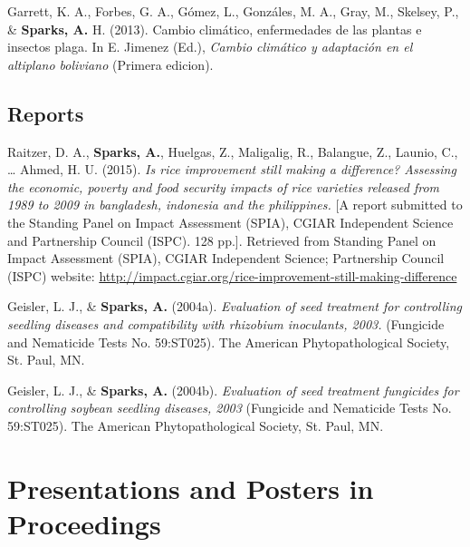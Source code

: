 \documentclass[11pt, a4paper]{awesome-cv}
\begin{document}
\leavevmode\hypertarget{ref-Garrett2013}{}%
Garrett, K. A., Forbes, G. A., Gómez, L., Gonzáles, M. A., Gray, M., Skelsey, P., \& \textbf{Sparks, A.} H. (2013). Cambio climático, enfermedades de las plantas e insectos plaga. In E. Jimenez (Ed.), \emph{Cambio climático y adaptación en el altiplano boliviano} (Primera edicion).

\endgroup

\hypertarget{reports}{%
\subsection{Reports}\label{reports}}

\begingroup
\setlength{\parindent}{-0.5in}
\setlength{\leftskip}{0.5in}

\hypertarget{refs_reports}{}
\leavevmode\hypertarget{ref-Raitzer2015}{}%
Raitzer, D. A., \textbf{Sparks, A.}, Huelgas, Z., Maligalig, R., Balangue, Z., Launio, C., \ldots{} Ahmed, H. U. (2015). \emph{Is rice improvement still making a difference? Assessing the economic, poverty and food security impacts of rice varieties released from 1989 to 2009 in bangladesh, indonesia and the philippines.} {[}A report submitted to the Standing Panel on Impact Assessment (SPIA), CGIAR Independent Science and Partnership Council (ISPC). 128 pp.{]}. Retrieved from Standing Panel on Impact Assessment (SPIA), CGIAR Independent Science; Partnership Council (ISPC) website: \url{http://impact.cgiar.org/rice-improvement-still-making-difference}

\leavevmode\hypertarget{ref-Geisler2004}{}%
Geisler, L. J., \& \textbf{Sparks, A.} (2004a). \emph{Evaluation of seed treatment for controlling seedling diseases and compatibility with rhizobium inoculants, 2003.} (Fungicide and Nematicide Tests No. 59:ST025). The American Phytopathological Society, St. Paul, MN.

\leavevmode\hypertarget{ref-Geisler2004a}{}%
Geisler, L. J., \& \textbf{Sparks, A.} (2004b). \emph{Evaluation of seed treatment fungicides for controlling soybean seedling diseases, 2003} (Fungicide and Nematicide Tests No. 59:ST025). The American Phytopathological Society, St. Paul, MN.

\endgroup

\hypertarget{presentations-and-posters-in-proceedings}{%
\section{Presentations and Posters in Proceedings}\label{presentations-and-posters-in-proceedings}}
\end{document}
